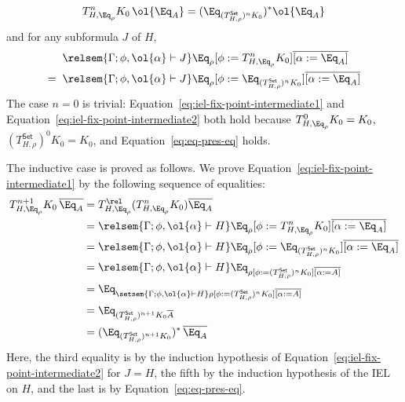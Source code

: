 \documentclass{lmcs}
\theoremstyle{plain}\newtheorem{satz}[thm]{Satz}
\newcommand{\set}{\mathsf{Set}}
\begin{document}
\begin{itemize}
\begin{equation}
T^n_{H, \Eq_{\rho}} K_0\, \ol{\Eq_A} = (\Eq_{(T^\set_{H, \rho})^n K_0})^*
\ol{\Eq_A}
\end{equation}
and for any subformula $J$ of $H$,
\begin{equation}\label{eq:iel-fix-point-intermediate2}
\begin{split}
& \relsem{\Gamma; \phi, \ol{\alpha} \vdash J} \Eq_{\rho} [\phi
    := T^{n}_{H,\Eq_{\rho}} K_0] \overline{[\alpha := \Eq_A]} \\
=\;\; & \relsem{\Gamma; \phi, \ol{\alpha} \vdash J} \Eq_{\rho}
[\phi := \Eq_{(T^\set_{H,\rho})^n K_0}] \overline{[\alpha := \Eq_A]}
\end{split}
\end{equation}
The case $n=0$ is trivial:
Equation~\ref{eq:iel-fix-point-intermediate1} and
Equation~\ref{eq:iel-fix-point-intermediate2} both hold because
$T^0_{H,\Eq_{\rho}} K_0 = K_0$, $(T^\set_{H,\rho})^0 K_0 = K_0$, and
Equation~\ref{eq:eq-pres-eq} holds.

The inductive case is proved as follows.  We prove
Equation~\ref{eq:iel-fix-point-intermediate1} by the following
sequence of equalities:
\[
\begin{split}
T^{n+1}_{H,\Eq_{\rho}} K_0\, \overline{\Eq_A}
&= T^\rel_{H,\Eq_{\rho}} (T^{n}_{H,\Eq_{\rho}} K_0)
\overline{\Eq_A} \\ 
&= \relsem{\Gamma; \phi, \ol{\alpha} \vdash H} \Eq_{\rho} [\phi
  := T^{n}_{H, \Eq_{\rho}} K_0] \overline{[\alpha :=
    \Eq_A]} \\ 
&= \relsem{\Gamma; \phi, \ol{\alpha} \vdash H} \Eq_{\rho} [\phi
  := \Eq_{(T^\set_{H,\rho})^{n} K_0}] \overline{[\alpha :=
    \Eq_A]} \\ 
&= \relsem{\Gamma; \phi, \ol{\alpha} \vdash H} \Eq_{\rho [\phi
    := (T^\set_{H,\rho})^{n} K_0] \overline{[\alpha :=
      A]}} \\ 
&= \Eq_{\setsem{\Gamma; \phi, \ol{\alpha} \vdash H} \rho [\phi
    := (T^\set_{H,\rho})^{n} K_0] \overline{[\alpha :=
      A]}} \\ 
&= \Eq_{(T^\set_{H,\rho})^{n+1} K_0 \overline{A}} \\ 
&= (\Eq_{(T^\set_{H,\rho})^{n+1} K_0})^*\, \overline{\Eq_A} 
\end{split}
\]
Here, the third equality is by the induction hypothesis of
Equation~\ref{eq:iel-fix-point-intermediate2} for $J = H$, the fifth
by the induction hypothesis of the IEL on $H$, and the last is by
Equation~\ref{eq:eq-pres-eq}.

\vspace*{0.1in}


\end{itemize}
\end{document}
